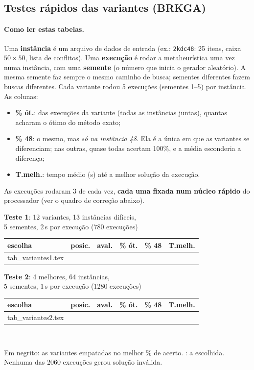\documentclass[11pt,a4paper]{article}
\begin{document}
\subsection{Testes rápidos das variantes (BRKGA)}
\paragraph{Como ler estas tabelas.} Uma \textbf{instância} é um arquivo de dados de entrada (ex.: \texttt{2kdc48}:
25 itens, caixa $50\times50$, lista de conflitos). Uma \textbf{execução} é rodar a metaheurística uma vez numa
instância, com uma \textbf{semente} (o número que inicia o gerador aleatório). A mesma semente faz sempre o mesmo
caminho de busca; sementes diferentes fazem buscas diferentes. Cada variante rodou 5 execuções (sementes 1--5) por
instância. As colunas:
\begin{itemize}[leftmargin=*,itemsep=0pt]
\item \textbf{\% ót.}: das execuções da variante (todas as instâncias juntas), quantas acharam o ótimo do método exato;
\item \textbf{\% 48}: o mesmo, mas \emph{só na instância 48}. Ela é a única em que as variantes se diferenciam; nas
  outras, quase todas acertam 100\%, e a média esconderia a diferença;
\item \textbf{T.melh.}: tempo médio (s) até a melhor solução da execução.
\end{itemize}
As execuções rodaram 3 de cada vez, \textbf{cada uma fixada num núcleo rápido} do processador (ver o quadro de correção abaixo).

\begin{center}\footnotesize\setlength{\tabcolsep}{3pt}
\begin{minipage}[t]{0.49\textwidth}\centering
\textbf{Teste 1}: 12 variantes, 13 instâncias difíceis,\\ 5 sementes, 2\,s por execução (780 execuções)\\[2pt]
\begin{tabular}{@{}lllrrr@{}}
\toprule
escolha & posic. & aval. & \% ót. & \% 48 & T.melh. \\ \midrule
{} tab_variantes1.tex 
\bottomrule
\end{tabular}
\end{minipage}\hfill
\begin{minipage}[t]{0.47\textwidth}\centering
\textbf{Teste 2}: 4 melhores, 64 instâncias,\\ 5 sementes, 1\,s por execução (1280 execuções)\\[2pt]
\begin{tabular}{@{}lllrrr@{}}
\toprule
escolha & posic. & aval. & \% ót. & \% 48 & T.melh. \\ \midrule
{} tab_variantes2.tex 
\bottomrule
\end{tabular}
\\[6pt]
\raggedright\footnotesize Em negrito: as variantes empatadas no melhor \% de acerto. \checkmark: a escolhida.
Nenhuma das 2060 execuções gerou solução inválida.
\end{minipage}
\end{center}
\end{document}
